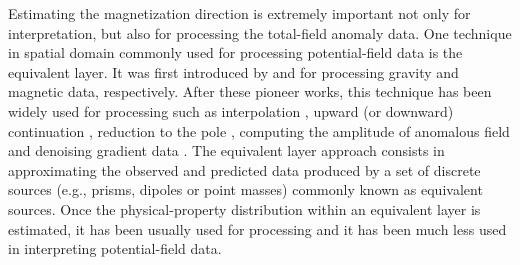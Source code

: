 Estimating the magnetization direction is extremely important not only for interpretation, but also for processing the total-field anomaly data. One technique in spatial domain commonly used for processing potential-field data is the equivalent layer. It was first introduced by \cite{dampney1969} and \cite{emilia_massey_1974} for processing gravity and magnetic data, respectively. After these pioneer works, this technique has been widely used for processing such as interpolation \citep{cordell_1992,mendonca-silva_1994,barnes-lumley_2011,siqueira_etal_2017}, upward (or downward) continuation  \citep{hansen-miyazaki_1984,li-oldenburg_2010}, reduction to the pole \citep{silva_1986,leao-silva_1989,guspi-novara_2009,oliveirajr-etal_2013}, computing the amplitude of anomalous field \citep{li_li_2014} and denoising gradient data \citep{martinez_li_2016}. The equivalent layer approach consists in approximating the observed and predicted data produced by a set of discrete sources (e.g., prisms, dipoles or point masses) commonly known as equivalent sources. Once the physical-property distribution within an equivalent layer is estimated, it has been usually used for processing and it has been much less used in interpreting potential-field data. 


